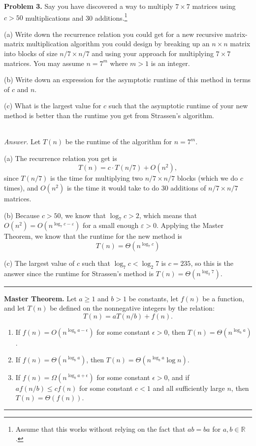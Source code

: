 \documentclass[12pt]{article}  %
\begin{document}
\textbf{Problem 3.} Say you have discovered a way to multiply $7 \times 7$ matrices using $c > 50$ multiplications and 30 additions.\footnote{Assume that this works without relying on the fact that $ab = ba$ for $a,b \in \mathbb{R}$.}

(a) Write down the recurrence relation you could get for a new recursive matrix-matrix multiplication algorithm you could design by breaking up an $n \times n$ matrix into blocks of size $n/7 \times n/7$ and using your approach for multiplying $7 \times 7$ matrices. You may assume $n = 7^m$ where $m > 1$ is an integer.


(b) Write down an expression for the asymptotic runtime of this method in terms of $c$ and $n$.

(c) What is the largest value for $c$ such that the asymptotic runtime of your new method is better than the runtime you get from Strassen's algorithm. 


~\\

\textit{Answer.} Let $T(n)$ be the runtime of the algorithm for $n = 7^m$.

(a) The recurrence relation you get is
\begin{equation*}
	T(n) = c \cdot T(n/7) + O(n^2),
\end{equation*}
since $T(n/7)$ is the time for multiplying two $n/7 \times n/7$ blocks (which we do $c$ times), and $O(n^2)$ is the time it would take to do 30 additions of $n/7 \times n/7$ matrices.

(b) Because $c > 50$, we know that $\log_7 c > 2$, which means that $O(n^2) = O(n^{\log_7 c - \varepsilon})$ for a small enough $\varepsilon > 0$. Applying the Master Theorem, we know that the runtime for the new method is
\begin{equation*}
	T(n) = \Theta(n^{\log_7 c})
\end{equation*}

(c) The largest value of $c$ such that $\log_7 c < \log_2 7$ is $c = 235$, so this is the answer since the runtime for Strassen's method is $T(n) = \Theta(n^{\log_2 7})$.




\rule{\textwidth}{0.4pt}
\textbf{Master Theorem.} Let $a \geq 1$ and $b > 1$ be constants, let $f(n)$ be a function, and let $T(n)$ be defined on the nonnegative integers by the relation:
\begin{equation*}
T(n) = aT(n/b) + f(n).
\end{equation*}


\begin{enumerate}
	\item If $f(n) = O(n^{\log_b a - \epsilon})$ for some constant $\epsilon > 0$, then $T(n) = \Theta (n^{\log_b a })$.
	\item If $f(n) = \Theta(n^{\log_b a})$, then $T(n) = \Theta (n^{\log_b a } \log n)$.
	\item If $f(n) = \Omega(n^{\log_b a + \epsilon})$ for some constant $\epsilon > 0$, and if $a f(n/b) \leq c f(n)$ for some constant $c < 1$ and all sufficiently large $n$, then $T(n) = \Theta (f(n))$.
\end{enumerate}
\rule{\textwidth}{0.4pt}
\end{document}
